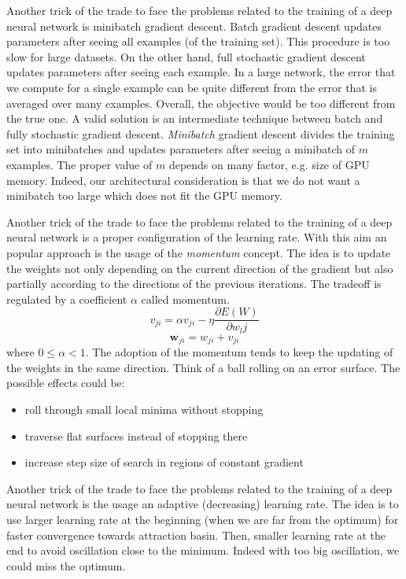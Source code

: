 Another trick of the trade to face the problems related to the training of a deep neural network is minibatch gradient descent. Batch gradient descent updates parameters after seeing all examples (of the training set). This procedure is too slow for large datasets. On the other hand, full stochastic gradient descent updates parameters after seeing each example. In a large network, the error that we compute for a single example can be quite different from the error that is averaged over many examples. Overall, the objective would be too different from the true one. A valid solution is an intermediate technique between batch and fully stochastic gradient descent. \textit{Minibatch} gradient descent divides the training set into minibatches and updates parameters after seeing a minibatch of $m$ examples. The proper value of $m$ depends on many factor, e.g. size of GPU memory. Indeed, our architectural consideration is that we do not want a minibatch too large which does not fit the GPU memory. \newline

Another trick of the trade to face the problems related to the training of a deep neural network is a proper configuration of the learning rate. With this aim an popular approach is the usage of the \textit{momentum} concept. The idea is to update the weights not only depending on the current direction of the gradient but also partially according to the directions of the previous iterations. The tradeoff is regulated by a coefficient $\alpha$ called momentum.
$$v_{ji} = \alpha v_{ji} - \eta \frac{\partial E(W)}{\partial w_lj}$$
$$\pmb{w}_{ji} = w_{ji} + v_{ji}$$
where $0 \leq \alpha < 1$.
The adoption of the momentum tends to keep the updating of the weights in the same direction. Think of a ball rolling on an error surface. The possible effects could be:
\begin{itemize}
    \item roll through small local minima without stopping
    
    \item traverse flat surfaces instead of stopping there
    
    \item increase step size of search in regions of constant gradient
\end{itemize}

Another trick of the trade to face the problems related to the training of a deep neural network is the usage an adaptive (decreasing) learning rate. The idea is to use larger learning rate at the beginning (when we are far from the optimum) for faster convergence towards attraction basin. Then, smaller learning rate at the end to avoid oscillation close to the minimum. Indeed with too big oscillation, we could miss the optimum.

